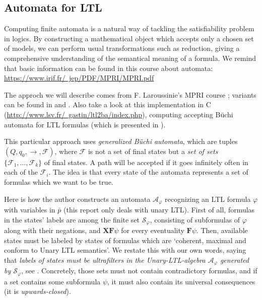 \documentclass[11pt]{article}
\newcommand{\X}{{\mathbf{X}}}
\newcommand{\F}{{\mathbf{F}}}
\newcommand{\phii}{{\varphi}}
\theoremstyle{definition}
\begin{document}
\subsection{Automata for LTL}\label{subsec:automLTL}

Computing finite automata is a natural way of tackling the satisfiability problem in logics. By constructing a mathematical object which accepts only
a chosen set of models, we can perform usual transformations such as reduction, giving a comprehensive understanding of the semantical 
meaning of a formula. We remind that basic information can be found in this course about automata:
\href{https://www.irif.fr/~jep/PDF/MPRI/MPRI.pdf}{https://www.irif.fr/~jep/PDF/MPRI/MPRI.pdf}

The approch we will describe comes from F. Laroussinie's MPRI course \cite[pages 22-36]{LarouLTL}; variants can be found in 
\cite[Section 3]{CristauAuto} and \cite[Section 1.3]{GastinAuto}. Also take a look at this implementation in C 
(\href{http://www.lsv.fr/~gastin/ltl2ba/index.php}{http://www.lsv.fr/~gastin/ltl2ba/index.php}), computing accepting Büchi automata for LTL
formulas (which is presented in \cite[Pages 53-65]{OddouxProg}).
    
This particular approach uses \emph{generalized Büchi automata}, which are tuples $(Q,q_0,\to,\mathcal{F})$, where $\mathcal{F}$ is not 
a set of final states but a \emph{set of sets} $\{\mathcal{F}_1,\ldots,\mathcal{F}_k\}$ of final states. A path will be accepted if 
it goes infinitely often in each of the $\mathcal{F}_i$. The idea is that every state of the automata represents a set of formulas which
we want to be true. 

Here is how the author constructs an automata $\mathcal{A}_\phii$ recognizing an LTL formula $\phii$ with variables in 
$\bar{p}$ (this report only deals with unary LTL).
First of all, formulas in the states' labels are among the finite set $\mathcal{S}_\phii$, consisting of subformulas of $\phii$
along with their negations, and $\X\F\psi$ for every eventuality $\F\psi$. Then, available states must be labeled by states of formulas 
which are `coherent, maximal and conform to Unary LTL semantics'. We restate this with our own words, saying that \emph{labels of states
must be ultrafilters in the Unary-LTL-algebra $\mathcal{A}_{\phii}$ generated by $\mathcal{S}_\phii$}, see \cite[Section 4.1]{GehvG22}. Concretely, those sets
must not contain contradictory formulas, and if a set contains some subformula $\psi$, it must also contain its universal consequences (it is 
\emph{upwards-closed}).
\end{document}
